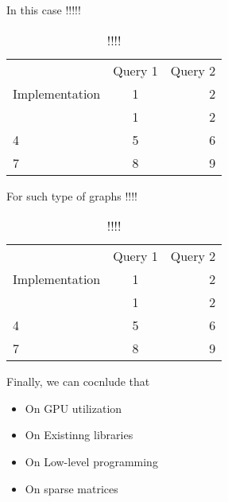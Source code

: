 In this case !!!!!


\begin{table}
\caption{!!!!}
\label{tbl:table1}
\begin{tabular}{ l | c | r }
    \hline
    \multirow{3}{*}{Implementation} & Query 1 & Query 2 \\
                                    & 1 & 2 \\
                                    & 1 & 2 \\ \hline
    4 & 5 & 6 \\ \hline
    7 & 8 & 9 \\
    \hline
  \end{tabular}
\end{table}


For such type of graphs !!!!


\begin{table}
\caption{!!!!}
\label{tbl:table1}
\begin{tabular}{ l | c | r }
    \hline
    \multirow{3}{*}{Implementation} & Query 1 & Query 2 \\
                                    & 1 & 2 \\
                                    & 1 & 2 \\ \hline
    4 & 5 & 6 \\ \hline
    7 & 8 & 9 \\
    \hline
  \end{tabular}
\end{table}


Finally, we can cocnlude that
\begin{itemize}
\item On GPU utilization
\item On Existinng libraries
\item On Low-level programming
\item On sparse matrices
\end{itemize}
